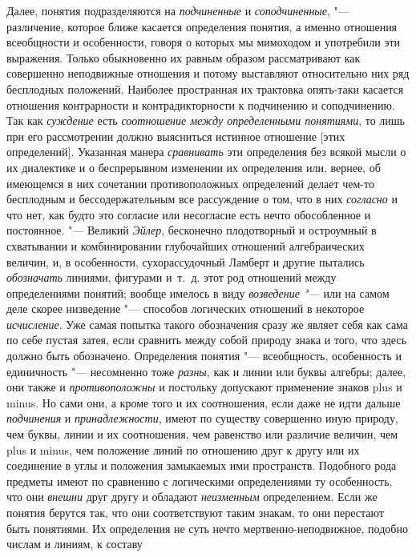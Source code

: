 {Далее, понятия подразделяются на
{\em подчиненные} и
{\em соподчиненные}, "---
различение, которое ближе касается определения понятия, а
именно отношения всеобщности и особенности, говоря о которых мы мимоходом и
употребили эти
выражения.
Только обыкновенно их равным образом
рассматривают как совершенно неподвижные отношения и потому выставляют
относительно них ряд бесплодных положений. Наиболее пространная их
трактовка опять-таки касается отношения контрарности и контрадикторности к
подчинению и соподчинению. Так как
{\em суждение} есть
{\em соотношение между определенными
понятиями}, то лишь при его рассмотрении должно выясниться
истинное отношение [этих определений]. Указанная манера
{\em сравнивать} эти
определения без всякой мысли о их диалектике и о беспрерывном изменении их
определения или, вернее, об имеющемся в них сочетании противоположных
определений делает чем-то бесплодным и бессодержательным все рассуждение о
том, что в них {\em согласно}
и что нет, как будто это согласие или несогласие есть нечто
обособленное и постоянное. "--- Великий
{\em Эйлер}, бесконечно
плодотворный и остроумный в схватывании и комбинировании глубочайших
отношений алгебраических величин, и, в особенности, сухорассудочный Ламберт
и другие пытались {\em обозначать}
линиями, фигурами и~т.~д. этот род отношений между
определениями понятий; вообще имелось в виду
{\em возведение "--- }или на
самом деле скорее низведение "--- способов логических отношений
в некоторое {\em исчисление}.
Уже самая попытка такого обозначения сразу же являет себя как
сама по себе пустая затея, если сравнить между собой природу знака и того,
что здесь должно быть обозначено. Определения понятия
"--- всеобщность, особенность и единичность
"--- несомненно тоже
{\em разны}, как и линии
или буквы алгебры; далее, они также и
{\em противоположны} и
постольку допускают применение знаков plus и minus.
Но сами они, а кроме того и их соотношения, если даже не идти
дальше {\em подчинения} и
{\em принадлежности},
имеют по существу совершенно иную природу, чем буквы, линии и
их соотношения, чем равенство или различие величин, чем plus
и minus, чем положение линий по отношению друг
к другу или их соединение в углы и положения замыкаемых ими пространств.
Подобного рода предметы имеют по сравнению с логическими определениями ту
особенность, что они {\em внешни}
друг другу и обладают
{\em неизменным}
определением. Если же понятия берутся так, что они
соответствуют таким знакам, то они перестают быть понятиями. Их определения
не суть нечто мертвенно-неподвижное, подобно числам и линиям, к составу
}
